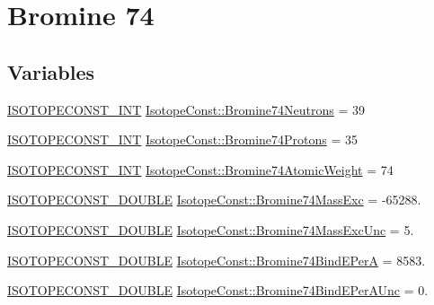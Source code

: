 \hypertarget{group___isotope_const-_bromine-_br74}{}\section{Bromine 74}
\label{group___isotope_const-_bromine-_br74}
\subsection*{Variables}
\begin{DoxyCompactItemize}
\item 
\mbox{\hyperlink{group___isotope_const-_macros_ga5f18360b3e99483a35c32d789e62621c}{I\+S\+O\+T\+O\+P\+E\+C\+O\+N\+S\+T\+\_\+\+I\+NT}} \mbox{\hyperlink{group___isotope_const-_bromine-_br74_gad4f927bd79d7ab789a20fcfa64a3418b}{Isotope\+Const\+::\+Bromine74\+Neutrons}} = 39
\item 
\mbox{\hyperlink{group___isotope_const-_macros_ga5f18360b3e99483a35c32d789e62621c}{I\+S\+O\+T\+O\+P\+E\+C\+O\+N\+S\+T\+\_\+\+I\+NT}} \mbox{\hyperlink{group___isotope_const-_bromine-_br74_ga517f4f7309e7de9d6a05d91de67c63c8}{Isotope\+Const\+::\+Bromine74\+Protons}} = 35
\item 
\mbox{\hyperlink{group___isotope_const-_macros_ga5f18360b3e99483a35c32d789e62621c}{I\+S\+O\+T\+O\+P\+E\+C\+O\+N\+S\+T\+\_\+\+I\+NT}} \mbox{\hyperlink{group___isotope_const-_bromine-_br74_ga33c5dca754995a2ec6daf427fc24259e}{Isotope\+Const\+::\+Bromine74\+Atomic\+Weight}} = 74
\item 
\mbox{\hyperlink{group___isotope_const-_macros_ga8f45a7272ce02c0b4c65c44636ed719a}{I\+S\+O\+T\+O\+P\+E\+C\+O\+N\+S\+T\+\_\+\+D\+O\+U\+B\+LE}} \mbox{\hyperlink{group___isotope_const-_bromine-_br74_ga8d05d830261a87a9ba2e3e7ca6e551b2}{Isotope\+Const\+::\+Bromine74\+Mass\+Exc}} = -\/65288.
\item 
\mbox{\hyperlink{group___isotope_const-_macros_ga8f45a7272ce02c0b4c65c44636ed719a}{I\+S\+O\+T\+O\+P\+E\+C\+O\+N\+S\+T\+\_\+\+D\+O\+U\+B\+LE}} \mbox{\hyperlink{group___isotope_const-_bromine-_br74_gaf09eb62a5066f4528d4eee92b5e39ade}{Isotope\+Const\+::\+Bromine74\+Mass\+Exc\+Unc}} = 5.
\item 
\mbox{\hyperlink{group___isotope_const-_macros_ga8f45a7272ce02c0b4c65c44636ed719a}{I\+S\+O\+T\+O\+P\+E\+C\+O\+N\+S\+T\+\_\+\+D\+O\+U\+B\+LE}} \mbox{\hyperlink{group___isotope_const-_bromine-_br74_gaead118d0599c6cf20dfb1e05797cea2e}{Isotope\+Const\+::\+Bromine74\+Bind\+E\+PerA}} = 8583.
\item 
\mbox{\hyperlink{group___isotope_const-_macros_ga8f45a7272ce02c0b4c65c44636ed719a}{I\+S\+O\+T\+O\+P\+E\+C\+O\+N\+S\+T\+\_\+\+D\+O\+U\+B\+LE}} \mbox{\hyperlink{group___isotope_const-_bromine-_br74_ga0934fa5200443f06c4e8b0cd6df3509e}{Isotope\+Const\+::\+Bromine74\+Bind\+E\+Per\+A\+Unc}} = 0.

\end{DoxyCompactItemize}
